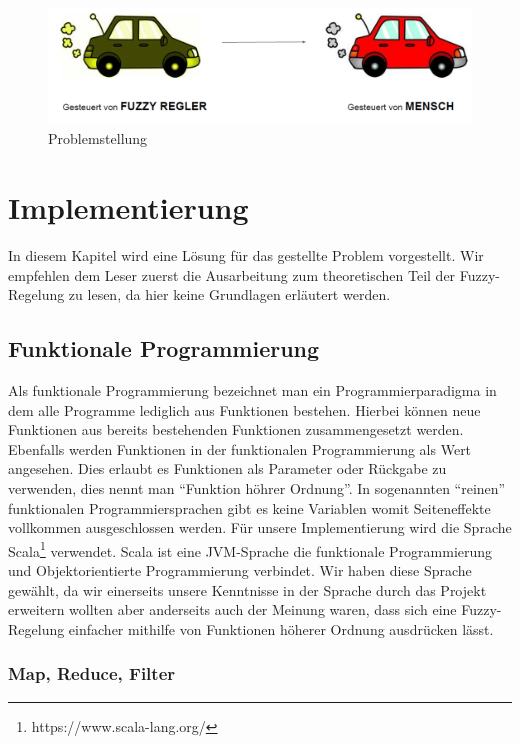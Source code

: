 \documentclass[12pt,a4paper,bibliography=totocnumbered,listof=totocnumbered, abstracton]{scrartcl}
\theoremstyle{Umgebung}
\begin{document}
\begin{figure}
	\centering
	\includegraphics[width=0.9\linewidth]{img/practical/problem}
	\caption{Problemstellung}
	\label{fig:problem}
\end{figure}

\section{Implementierung}

In diesem Kapitel wird eine Lösung für das gestellte Problem vorgestellt. Wir empfehlen dem Leser zuerst die Ausarbeitung zum theoretischen Teil der Fuzzy-Regelung zu lesen, da hier keine Grundlagen erläutert werden.

\subsection{Funktionale Programmierung}

Als funktionale Programmierung bezeichnet man ein Programmierparadigma in dem alle Programme lediglich aus Funktionen bestehen. Hierbei können neue Funktionen aus bereits bestehenden Funktionen zusammengesetzt werden. Ebenfalls werden Funktionen in der funktionalen Programmierung als Wert angesehen. Dies erlaubt es Funktionen als Parameter oder Rückgabe zu verwenden, dies nennt man \enquote{Funktion höhrer Ordnung}. In sogenannten \enquote{reinen} funktionalen Programmiersprachen gibt es keine Variablen womit Seiteneffekte vollkommen ausgeschlossen werden. Für unsere Implementierung wird die Sprache Scala\footnote{https://www.scala-lang.org/} verwendet. Scala ist eine JVM-Sprache die funktionale Programmierung und Objektorientierte Programmierung verbindet. Wir haben diese Sprache gewählt, da wir einerseits unsere Kenntnisse in der Sprache durch das Projekt erweitern wollten aber anderseits auch der Meinung waren, dass sich eine Fuzzy-Regelung einfacher mithilfe von Funktionen höherer Ordnung ausdrücken lässt.

\subsubsection{Map, Reduce, Filter}
\end{document}
